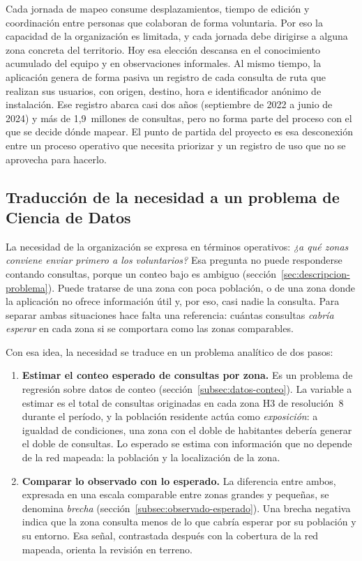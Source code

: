Cada jornada de mapeo consume desplazamientos, tiempo de edición y coordinación entre
personas que colaboran de forma voluntaria. Por eso la capacidad de la organización es
limitada, y cada jornada debe dirigirse a alguna zona concreta del territorio. Hoy esa
elección descansa en el conocimiento acumulado del equipo y en observaciones informales.
Al mismo tiempo, la aplicación genera de forma pasiva un registro de cada consulta de ruta
que realizan sus usuarios, con origen, destino, hora e identificador anónimo de
instalación. Ese registro abarca casi dos años (septiembre de 2022 a junio de 2024) y más
de 1,9~millones de consultas, pero no forma parte del proceso con el que se decide dónde
mapear. El punto de partida del proyecto es esa desconexión entre un proceso operativo que
necesita priorizar y un registro de uso que no se aprovecha para hacerlo.

\subsection{Traducción de la necesidad a un problema de Ciencia de Datos}
\label{sec:traduccion-necesidad}

La necesidad de la organización se expresa en términos operativos: \emph{¿a qué zonas
conviene enviar primero a los voluntarios?} Esa pregunta no puede responderse contando
consultas, porque un conteo bajo es ambiguo (sección~\ref{sec:descripcion-problema}).
Puede tratarse de una zona con poca población, o de una zona donde la aplicación no ofrece
información útil y, por eso, casi nadie la consulta. Para separar ambas situaciones hace
falta una referencia: cuántas consultas \emph{cabría esperar} en cada zona si se
comportara como las zonas comparables.

Con esa idea, la necesidad se traduce en un problema analítico de dos pasos:

\begin{enumerate}
  \item \textbf{Estimar el conteo esperado de consultas por zona.} Es un problema de
    regresión sobre datos de conteo (sección~\ref{subsec:datos-conteo}). La variable a
    estimar es el total de consultas originadas en cada zona H3 de resolución~8 durante el
    período, y la población residente actúa como \emph{exposición}: a igualdad de
    condiciones, una zona con el doble de habitantes debería generar el doble de consultas.
    Lo esperado se estima con información que no depende de la red mapeada: la población y
    la localización de la zona.
  \item \textbf{Comparar lo observado con lo esperado.} La diferencia entre ambos,
    expresada en una escala comparable entre zonas grandes y pequeñas, se denomina
    \emph{brecha} (sección~\ref{subsec:observado-esperado}). Una brecha negativa indica que
    la zona consulta menos de lo que cabría esperar por su población y su entorno. Esa
    señal, contrastada después con la cobertura de la red mapeada, orienta la revisión en
    terreno.
\end{enumerate}

